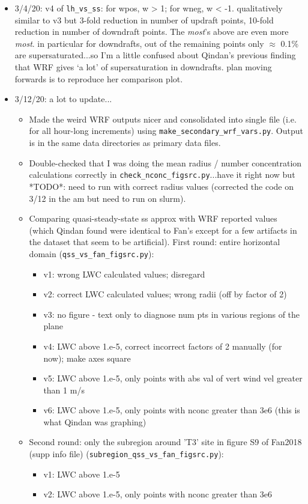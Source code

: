 \documentclass{article}
\begin{document}
\begin{itemize}
	\item 3/4/20: v4 of \texttt{lh\_vs\_ss}: for wpos, w > 1; for wneg, w < -1. qualitatively similar to v3 but 3-fold reduction in number of updraft points, 10-fold reduction in number of downdraft points. The \emph{most}'s above are even more \emph{most}. in particular for downdrafts, out of the remaining points only $\approx$ 0.1\% are supersaturated...so I'm a little confused about Qindan's previous finding that WRF gives `a lot' of supersaturation in downdrafts. plan moving forwards is to reproduce her comparison plot. 
	\item 3/12/20: a lot to update...
	\begin{itemize}
		\item Made the weird WRF outputs nicer and consolidated into single file (i.e. for all hour-long increments) using \texttt{make\_secondary\_wrf\_vars.py}. Output is in the same data directories as primary data files.
		\item Double-checked that I was doing the mean radius / number concentration calculations correctly in \texttt{check\_nconc\_figsrc.py}...have it right now but *TODO*: need to run with correct radius values (corrected the code on 3/12 in the am but need to run on slurm).
		\item Comparing quasi-steady-state ss approx with WRF reported values (which Qindan found were identical to Fan's except for a few artifacts in the dataset that seem to be artificial). First round: entire horizontal domain (\texttt{qss\_vs\_fan\_figsrc.py}): 
		\begin{itemize}
			\item v1: wrong LWC calculated values; disregard
			\item v2: correct LWC calculated values; wrong radii (off by factor of 2)
			\item v3: no figure - text only to diagnose num pts in various regions of the plane
			\item v4: LWC above 1.e-5, correct incorrect factors of 2 manually (for now); make axes square
			\item v5: LWC above 1.e-5, only points with abs val of vert wind vel greater than 1 m/s
			\item v6: LWC above 1.e-5, only points with nconc greater than 3e6 (this is what Qindan was graphing)
		\end{itemize}
		\item Second round: only the subregion around 'T3' site in figure S9 of Fan2018 (supp info file) (\texttt{subregion\_qss\_vs\_fan\_figsrc.py}):
		\begin{itemize}
			\item v1: LWC above 1.e-5
			\item v2: LWC above 1.e-5, only points with nconc greater than 3e6
		\end{itemize}
	\end{itemize}
\end{itemize}
\end{document}
